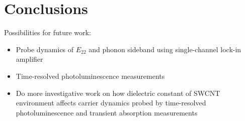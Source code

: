 \chapter{Conclusions}

Possibilities for future work:
\begin{itemize}
  \item Probe dynamics of $E_{22}$ and phonon sideband using single-channel lock-in amplifier
  \item Time-resolved photoluminescence measurements \cite{murakami2009existence}
  \item Do more investigative work on how dielectric constant of SWCNT environment affects carrier dynamics probed by time-resolved photoluminescence and transient absorption measurements 
\end{itemize}
